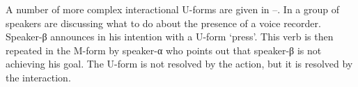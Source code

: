 \begin{exe}
	\label{ex2:19/09/14 p.97}
	\begin{xlist}
		\label{ex2:19/09/14 p.97-1}
		\label{ex2:19/09/14 p.97-2}
	\end{xlist}
\end{exe}

A number of more complex interactional U-forms are given
in --.
In  a group of speakers are discussing what
to do about the presence of a voice recorder.
Speaker-β announces in  his intention
with a U-form  `press'.
This verb is then repeated in the M-form by speaker-α who
points out that speaker-β is not achieving his goal.
The U-form is not resolved by the action,
but it is resolved by the interaction.


